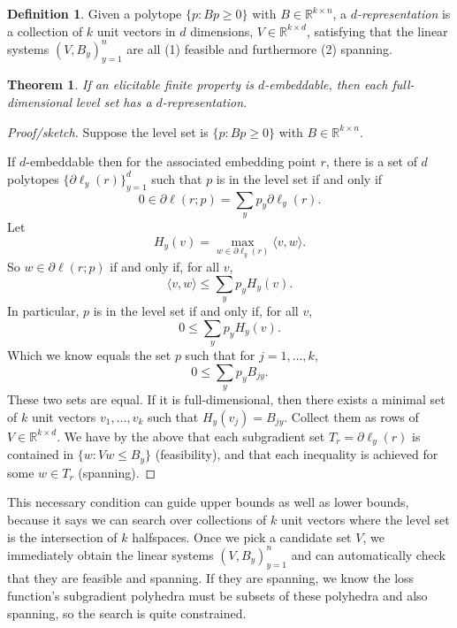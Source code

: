 \documentclass[12pt]{article}
\newtheorem{theorem}{Theorem}
\theoremstyle{definition}
\newtheorem{definition}{Definition}
\newcommand{\reals}{\mathbb{R}}
\begin{document}
\begin{definition}
  Given a polytope $\{p : Bp \geq 0\}$ with $B \in \reals^{k \times n}$, a \emph{$d$-representation} is a collection of $k$ unit vectors in $d$ dimensions, $V \in \reals^{k \times d}$, satisfying that the linear systems $(V, B_y)_{y=1}^n$ are all (1) feasible and furthermore (2) spanning.
\end{definition}

\begin{theorem}
  If an elicitable finite property is $d$-embeddable, then each full-dimensional level set has a $d$-representation.
\end{theorem}
\begin{proof}[Proof/sketch]
  Suppose the level set is $\{p : Bp \geq 0\}$ with $B \in \reals^{k \times n}$.
  
  If $d$-embeddable then for the associated embedding point $r$, there is a set of $d$ polytopes $\{\partial \ell_y(r)\}_{y=1}^d$ such that $p$ is in the level set if and only if
  \[ 0 \in \partial \ell(r;p) = \sum_y p_y \partial \ell_y(r) . \]
  Let
    \[ H_y(v) = \max_{w \in \partial \ell_y(r)} \langle v , w \rangle . \]
  So $w \in \partial \ell(r;p)$ if and only if, for all $v$,
    \[ \langle v, w\rangle \leq \sum_y p_y H_y(v) . \]
  In particular, $p$ is in the level set if and only if, for all $v$,
    \[ 0 \leq \sum_y p_y H_y(v) . \]
  Which we know equals the set $p$ such that for $j=1,\dots,k$,
    \[ 0 \leq \sum_y p_y B_{jy} . \]
  These two sets are equal.
  If it is full-dimensional, then there exists a minimal set of $k$ unit vectors $v_1,\dots,v_k$ such that $H_y(v_j) = B_{jy}$.
  Collect them as rows of $V \in \reals^{k \times d}$.
  We have by the above that each subgradient set $T_r = \partial \ell_y(r)$ is contained in $\{w: Vw \leq B_y\}$ (feasibility), and that each inequality is achieved for some $w \in T_r$ (spanning).
\end{proof}

This necessary condition can guide upper bounds as well as lower bounds, because it says we can search over collections of $k$ unit vectors where the level set is the intersection of $k$ halfspaces.
Once we pick a candidate set $V$, we immediately obtain the linear systems $(V,B_y)_{y=1}^n$ and can automatically check that they are feasible and spanning.
If they are spanning, we know the loss function's subgradient polyhedra must be subsets of these polyhedra and also spanning, so the search is quite constrained.
\end{document}
